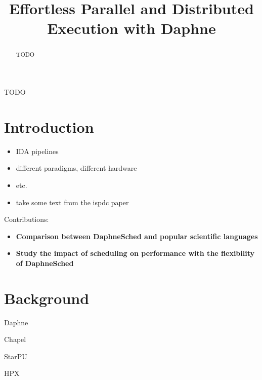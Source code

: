 \documentclass[conference,10pt]{IEEEtran}
\begin{document}
\title{Effortless Parallel and Distributed Execution with Daphne}

\author{
}

\maketitle
\thispagestyle{plain}
\pagestyle{plain}

\begin{abstract}
  TODO
\end{abstract}

\begin{IEEEkeywords}
TODO
\end{IEEEkeywords}

\section{Introduction}

\begin{itemize}
\item IDA pipelines
\item different paradigms, different hardware
\item etc.
\item take some text from the ispdc paper
\end{itemize}

Contributions:

\begin{itemize}
\item \textbf{Comparison between DaphneSched and popular scientific languages}
\item \textbf{Study the impact of scheduling on performance with the flexibility of DaphneSched}
\end{itemize}


\section{Background}

Daphne \cite{damme2022daphne}

Chapel \cite{callahan2004cascade}

StarPU \cite{augonnet2009starpu} 

HPX \cite{kaiser2014hpx}
\end{document}
